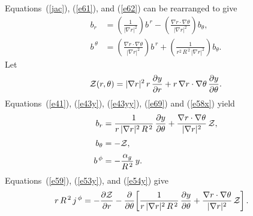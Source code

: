 \documentclass[12pt,prb,aps]{revtex4-1}
\begin{document}
Equations~(\ref{jac}), (\ref{e61}), and (\ref{e62}) can be rearranged to give\,\cite{tj}
\begin{align}
b_r &= \left(\frac{1}{|\nabla r|^2}\right)b^{\,r}- \left(\frac{\nabla r\cdot\nabla\theta}{|\nabla r|^2}\right)b_\theta,\label{e69}\\[0.5ex]
\label{e58x}
b^{\,\theta}& = \left(\frac{\nabla r\cdot\nabla\theta}{|\nabla r|^2}\right)b^{\,r} + \left(\frac{1}{r^2\,R^{\,2}\,|\nabla r|^2}\right) b_\theta.
\end{align}
Let 
\begin{equation}\label{zdef}
{\cal Z}(r,\theta)= |\nabla r|^2\,r\,\frac{\partial y}{\partial r} + r\,\nabla r\cdot\nabla\theta\,\frac{\partial y}{\partial\theta}.
\end{equation}
Equations~(\ref{e41}), (\ref{e43y}), (\ref{e43yy}), (\ref{e69}) and (\ref{e58x}) yield 
\begin{align}\label{e53y}
b_r &=\frac{1}{r\,|\nabla r|^2\,R^{\,2}}\,\frac{\partial y}{\partial \theta} + \frac{\nabla r\cdot\nabla\theta}{|\nabla r|^2}\,{\cal Z},\\[0.5ex]
b_\theta &= -{\cal Z},\label{e54y}\\[0.5ex]
b^{\,\phi} &= -\frac{\alpha_g}{R^{\,2}}\,y.\label{e55yy}
\end{align}
Equations~(\ref{e59}), (\ref{e53y}), and (\ref{e54y}) give
\begin{align}\label{e56yy}
r\,R^{\,2}\,j^{\,\phi} &=-\frac{\partial {\cal Z}}{\partial r}-\frac{\partial}{\partial\theta}\!\left[\frac{1}{r\,|\nabla r|^2\,R^{\,2}}\,\frac{\partial y}{\partial \theta} + \frac{\nabla r\cdot\nabla\theta}{|\nabla r|^2}\,{\cal Z}\right].
\end{align}
\end{document}
